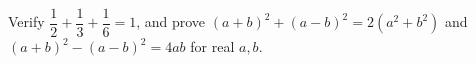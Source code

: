 Verify $\dfrac{1}{2}+\dfrac{1}{3}+\dfrac{1}{6}=1$, and prove $(a+b)^2+(a-b)^2=2(a^2+b^2)$ and $(a+b)^2-(a-b)^2=4ab$ for real $a,b$.
